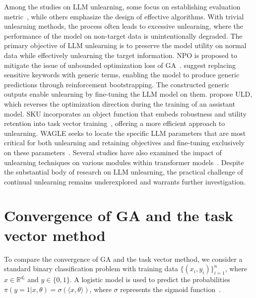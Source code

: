 \documentclass{article}
\theoremstyle{plain}
\theoremstyle{definition}
\theoremstyle{remark}
\begin{document}
Among the studies on LLM unlearning, some focus on establishing evaluation metric~\cite{DBLP:journals/corr/abs-2406-09179, wang2025rethinking, yang2025exploring, DBLP:journals/corr/abs-2402-16835, DBLP:journals/corr/abs-2410-08109,DBLP:journals/corr/abs-2410-15153}, while others emphasize the design of effective algorithms.
With trivial unlearning methods, the process often leads to excessive unlearning, where the performance of the model on non-target data is unintentionally degraded.
The primary objective of LLM unlearning is to preserve the model utility on normal data while effectively unlearning the target information.
NPO is proposed to mitigate the issue of unbounded optimization loss of GA~\cite{DBLP:journals/corr/abs-2404-05868}.
\citet{DBLP:journals/corr/abs-2310-02238} suggest replacing sensitive keywords with generic terms, enabling the model to produce generic predictions through reinforcement bootstrapping.
The constructed generic outputs enable unlearning by fine-tuning the LLM model on them.
\citet{DBLP:journals/corr/abs-2406-08607} propose ULD, which reverses the optimization direction during the training of an assistant model.
SKU incorporates an object function that embeds robustness and utility retention into task vector training~\cite{DBLP:conf/acl/0010DT0024}, offering a more efficient approach to unlearning.
WAGLE seeks to locate the specific LLM parameters that are most critical for both unlearning and retaining objectives and fine-tuning exclusively on these parameters~\cite{DBLP:journals/corr/abs-2410-17509}.
Several studies have also examined the impact of unlearning techniques on various modules within transformer models~\cite{DBLP:conf/emnlp/HongZHZ0Y24,DBLP:journals/corr/abs-2406-11614}.
Despite the substantial body of research on LLM unlearning, the practical challenge of continual unlearning remains underexplored and warrants further investigation.

\section{Convergence of GA and the task vector method}
\label{sec:convergence_tv_ga}

To compare the convergence of GA and the task vector method, we consider a standard binary classification problem with training data $\{(x_i, y_i)\}_{i=1}^n$, where $x\in\mathbb{R}^{d_l}$ and $y\in\{0,1\}$. A logistic model is used to predict the probabilities $\pi(y=1|x,\theta)=\sigma(\langle x,\theta\rangle)$, where $\sigma$ represents the sigmoid function~\cite{schmidt2017cpsc}.
\end{document}
